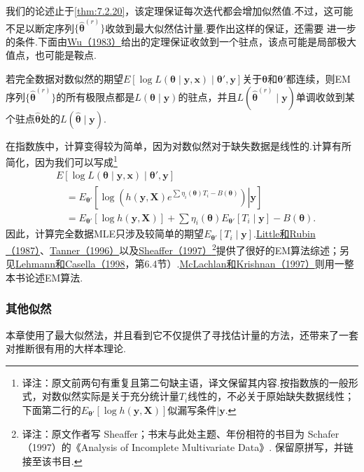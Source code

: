 我们的论述止于\autoref{thm:7.2.20}，该定理保证每次迭代都会增加似然值.不过，这可能不足以断定序列$\{\widehat{\boldsymbol\theta}^{(r)}\}$收敛到最大似然估计量.要作出这样的保证，还需要
进一步的条件.下面由\hyperref[bib:source335]{Wu（1983）}给出的定理保证收敛到一个驻点，该点可能是局部极大值点，也可能是鞍点.
\begin{theorem}\label{thm:7.5.2}
若完全数据对数似然的期望$E[\log L(\boldsymbol\theta\mid\boldsymbol y,\boldsymbol x)\mid\boldsymbol\theta',\boldsymbol y]$关于$\boldsymbol\theta$和$\boldsymbol\theta'$都连续，则EM序列$\{\widehat{\boldsymbol\theta}^{(r)}\}$的所有极限点都是$L(\boldsymbol\theta\mid\boldsymbol y)$的驻点，并且$L(\widehat{\boldsymbol\theta}^{(r)}\mid\boldsymbol y)$单调收敛到某个驻点$\widehat{\boldsymbol\theta}$处的$L(\widehat{\boldsymbol\theta}\mid\boldsymbol y)$.
\end{theorem}
在指数族中，计算变得较为简单，因为对数似然对于缺失数据是线性的.计算有所简化，因为我们可以写成\footnote{译注：原文前两句有重复且第二句缺主语，译文保留其内容.按指数族的一般形式，对数似然实际是关于充分统计量$T_i$线性的，不必关于原始缺失数据线性；下面第二行的$E_{\boldsymbol\theta'}[\log h(\boldsymbol y,\boldsymbol X)]$似漏写条件$\mid\boldsymbol y$.}
\begin{align*}
&E[\log L(\boldsymbol\theta\mid\boldsymbol y,\boldsymbol x)\mid\boldsymbol\theta',\boldsymbol y]\\
&\quad=E_{\boldsymbol\theta'}\left[\left.\log\left(h(\boldsymbol y,\boldsymbol X)e^{\sum\eta_i(\boldsymbol\theta)T_i-B(\boldsymbol\theta)}\right)\right|\boldsymbol y\right]\\
&\quad=E_{\boldsymbol\theta'}[\log h(\boldsymbol y,\boldsymbol X)]+\sum\eta_i(\boldsymbol\theta)E_{\boldsymbol\theta'}[T_i\mid\boldsymbol y]-B(\boldsymbol\theta).
\end{align*}
因此，计算完全数据MLE只涉及较简单的期望$E_{\boldsymbol\theta'}[T_i\mid\boldsymbol y]$.\hyperref[bib:source208]{Little和Rubin（1987）}、\hyperref[bib:source312]{Tanner（1996）}以及\hyperref[bib:source274]{Sheaffer（1997）}\footnote{译注：原文作者写 Sheaffer；书末与此处主题、年份相符的书目为 Schafer（1997）的《Analysis of Incomplete Multivariate Data》. 保留原拼写，并链接至该书目.}提供了很好的EM算法综述；另见\hyperref[bib:source200]{Lehmann和Casella（1998}，第6.4节）.\hyperref[bib:source216]{McLachlan和Krishnan（1997）}则用一整本书论述EM算法.

\subsubsection{其他似然}\label{sec:7.5.5}
本章使用了最大似然法，并且看到它不仅提供了寻找估计量的方法，还带来了一套对推断很有用的大样本理论.

